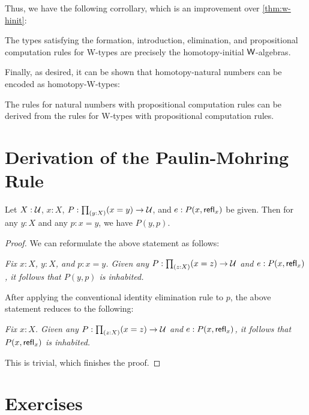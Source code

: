 Thus, we have the following corrollary, which is an improvement over \autoref{thm:w-hinit}:

\begin{cor}
The types satisfying the formation, introduction, elimination, and propositional computation rules for W-types are precisely the homotopy-initial $\mathsf{W}$-algebras.
\end{cor}

Finally, as desired, it can be shown that homotopy-natural numbers can be encoded as homotopy-W-types:

\begin{thm}
The rules for natural numbers with propositional computation rules can be derived from the rules for W-types with propositional computation rules.
\end{thm}


\section{Derivation of the Paulin-Mohring Rule}
\label{sec:deriv-pmrule}

\begin{thm}
Let $X : \mathcal{U}$, $x : X$, $P : \prd{y : X} (x = y) \to \type$, and $e : P(x, \mathsf{refl}_{x})$ be given. Then for any $y : X$ and any $p : x = y$, we have $P(y,p)$.
\end{thm}
\begin{proof}
We can reformulate the above statement as follows: \medskip

\emph{Fix $x : X$, $y : X$, and $p : x = y$. Given any $P : \prd{z : X} (x = z) \to \type$ and $e : P(x, \mathsf{refl}_{x})$, it follows that $P(y,p)$ is inhabited.}
\medskip

After applying the conventional identity elimination rule to $p$, the above statement reduces to the following:

\medskip

\emph{Fix $x : X$. Given any $P : \prd{z : X} (x = z) \to \type$ and $e : P(x, \mathsf{refl}_{x})$, it follows that $P(x,\mathsf{refl}_{x})$ is inhabited.}

\medskip
This is trivial, which finishes the proof.
\end{proof}

\section*{Exercises}

